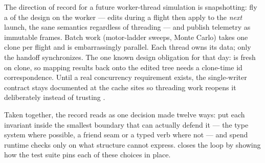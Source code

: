 \begin{designrule}
The direction of record for a future worker-thread simulation is snapshotting: fly a
 of the design on the worker --- edits during a flight then
apply to the \emph{next} launch, the sane semantics regardless of threading --- and
publish telemetry as immutable  frames. Batch work (motor-ladder sweeps,
Monte Carlo) takes one clone per flight and is embarrassingly parallel. Each thread owns
its data; only the handoff synchronizes. The one known design obligation for that day:
 is fresh on clone, so mapping results back onto the edited tree needs a
clone-time id correspondence. Until a real concurrency requirement exists, the
single-writer contract stays documented at the cache sites so threading work reopens it
deliberately instead of trusting .
\end{designrule}

Taken together, the record reads as one decision made twelve ways: put each invariant
inside the smallest boundary that can actually defend it --- the type system where
possible, a friend seam or a typed verb where not --- and spend runtime checks only on
what structure cannot express.  closes the loop by showing how
the test suite pins each of these choices in place.
